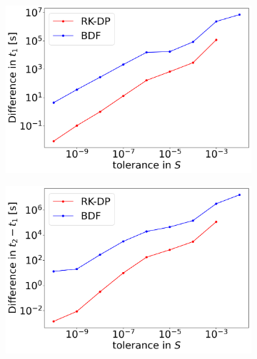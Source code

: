 \begin{figure}[H]
	\centering
	\begin{subfigure}[t]{0.32\textwidth}
		\centering
		\includegraphics[width=1\textwidth]{images/TANDEMcompactODEDifferentTolerancesSize101_AS_FirstEarthquakeTimeDiff.png}
	\end{subfigure} 
	\begin{subfigure}[t]{0.32\textwidth}
		\centering
		\includegraphics[width=1\textwidth]{images/TANDEMcompactODEDifferentTolerancesSize101_AS_PeriodDiff.png}
	\end{subfigure}
	\begin{subfigure}[t]{0.32\textwidth}
		\centering

\end{subfigure}
\end{figure}
